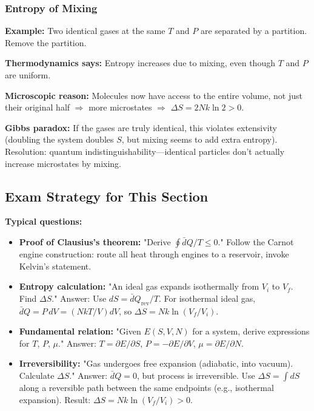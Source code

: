 \documentclass[9pt,twocoloumn]{article}
\begin{document}
\subsubsection{Entropy of Mixing}

\textbf{Example:} Two identical gases at the same $T$ and $P$ are separated by a partition. Remove the partition.

\textbf{Thermodynamics says:} Entropy increases due to mixing, even though $T$ and $P$ are uniform.

\textbf{Microscopic reason:} Molecules now have access to the entire volume, not just their original half $\Rightarrow$ more microstates $\Rightarrow$ $\Delta S = 2Nk \ln 2 > 0$.

\textbf{Gibbs paradox:} If the gases are truly identical, this violates extensivity (doubling the system doubles $S$, but mixing seems to add extra entropy). Resolution: quantum indistinguishability—identical particles don't actually increase microstates by mixing.

\subsection{Exam Strategy for This Section}

\textbf{Typical questions:}

\begin{itemize}
    \item \textbf{Proof of Clausius's theorem:} "Derive $\oint \bar{d}Q/T \leq 0$." Follow the Carnot engine construction: route all heat through engines to a reservoir, invoke Kelvin's statement.

    \item \textbf{Entropy calculation:} "An ideal gas expands isothermally from $V_i$ to $V_f$. Find $\Delta S$." Answer: Use $dS = \bar{d}Q_{\text{rev}}/T$. For isothermal ideal gas, $\bar{d}Q = P \, dV = (NkT/V) dV$, so $\Delta S = Nk \ln(V_f/V_i)$.

    \item \textbf{Fundamental relation:} "Given $E(S, V, N)$ for a system, derive expressions for $T$, $P$, $\mu$." Answer: $T = \partial E/\partial S$, $P = -\partial E/\partial V$, $\mu = \partial E/\partial N$.

    \item \textbf{Irreversibility:} "Gas undergoes free expansion (adiabatic, into vacuum). Calculate $\Delta S$." Answer: $\bar{d}Q = 0$, but process is irreversible. Use $\Delta S = \int dS$ along a reversible path between the same endpoints (e.g., isothermal expansion). Result: $\Delta S = Nk \ln(V_f/V_i) > 0$.
\end{itemize}
\end{document}
